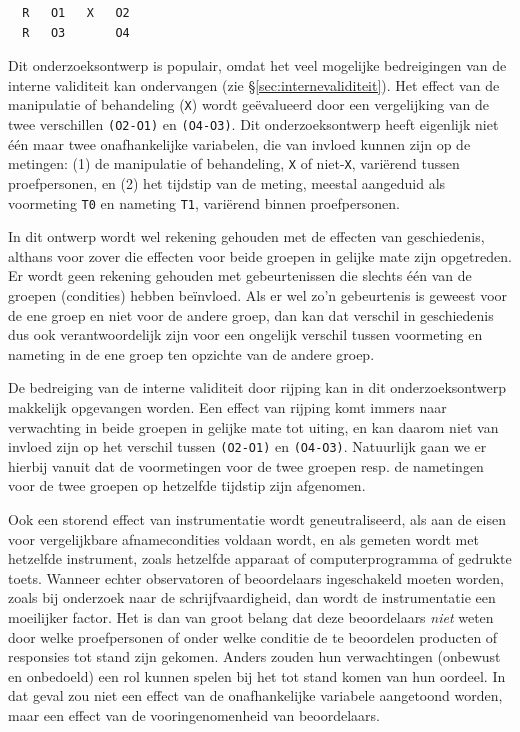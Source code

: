 \documentclass[
]{book}
\begin{document}
\begin{verbatim}
  R   O1   X   O2
  R   O3       O4
\end{verbatim}

Dit onderzoeksontwerp is populair, omdat het veel mogelijke bedreigingen
van de interne validiteit kan ondervangen (zie
§\ref{sec:internevaliditeit}). Het effect van de manipulatie of
behandeling (\texttt{X}) wordt geëvalueerd door een vergelijking van de twee
verschillen \texttt{(O2-O1)} en \texttt{(O4-O3)}. Dit onderzoeksontwerp heeft
eigenlijk niet één maar twee onafhankelijke variabelen, die van invloed
kunnen zijn op de metingen: (1) de manipulatie of behandeling, \texttt{X} of
niet-\texttt{X}, variërend tussen proefpersonen, en (2) het tijdstip van de
meting, meestal aangeduid als voormeting \texttt{T0} en nameting \texttt{T1},
variërend binnen proefpersonen.

In dit ontwerp wordt wel rekening gehouden met de effecten van
geschiedenis, althans voor zover die effecten voor beide groepen in
gelijke mate zijn opgetreden. Er wordt geen rekening gehouden met
gebeurtenissen die slechts één van de groepen (condities) hebben
beïnvloed. Als er wel zo'n gebeurtenis is geweest voor de ene groep en
niet voor de andere groep, dan kan dat verschil in geschiedenis dus ook
verantwoordelijk zijn voor een ongelijk verschil tussen voormeting en
nameting in de ene groep ten opzichte van de andere groep.

De bedreiging van de interne validiteit door rijping kan in dit
onderzoeksontwerp makkelijk opgevangen worden. Een effect van rijping
komt immers naar verwachting in beide groepen in gelijke mate tot
uiting, en kan daarom niet van invloed zijn op het verschil tussen
\texttt{(O2-O1)} en \texttt{(O4-O3)}. Natuurlijk gaan we er hierbij vanuit dat de
voormetingen voor de twee groepen resp. de nametingen voor de twee
groepen op hetzelfde tijdstip zijn afgenomen.

Ook een storend effect van instrumentatie wordt geneutraliseerd, als aan
de eisen voor vergelijkbare afnamecondities voldaan wordt, en als
gemeten wordt met hetzelfde instrument, zoals hetzelfde apparaat of
computerprogramma of gedrukte toets. Wanneer echter observatoren of
beoordelaars ingeschakeld moeten worden, zoals bij onderzoek naar de
schrijfvaardigheid, dan wordt de instrumentatie een moeilijker factor.
Het is dan van groot belang dat deze beoordelaars \emph{niet} weten door
welke proefpersonen of onder welke conditie de te beoordelen producten
of responsies tot stand zijn gekomen. Anders zouden hun verwachtingen
(onbewust en onbedoeld) een rol kunnen spelen bij het tot stand komen
van hun oordeel. In dat geval zou niet een effect van de onafhankelijke
variabele aangetoond worden, maar een effect van de vooringenomenheid
van beoordelaars.
\end{document}

